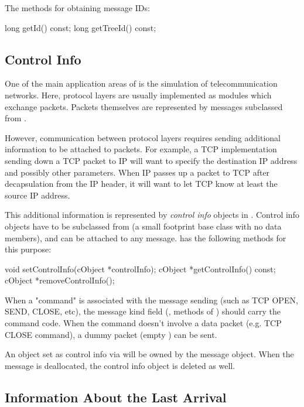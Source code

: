 The methods for obtaining message IDs:

\begin{cpp}
long getId() const;
long getTreeId() const;
\end{cpp}


\subsection{Control Info}

One of the main application areas of {\opp} is the simulation of
telecommunication networks. Here, protocol layers are usually
implemented as modules which exchange packets. Packets themselves
are represented by messages subclassed from .

However, communication between protocol layers requires sending
additional information to be attached to packets. For example,
a TCP implementation sending down a TCP packet to IP will want
to specify the destination IP address and possibly
other parameters. When IP passes up a packet to TCP after
decapsulation from the IP header, it will want to let TCP know
at least the source IP address.

This additional information is represented by \textit{control info} objects
in {\opp}. Control info objects have to be subclassed from 
(a small footprint base class with no data members), and can be attached to
any message.  has the following methods for this purpose:

\begin{cpp}
void setControlInfo(cObject *controlInfo);
cObject *getControlInfo() const;
cObject *removeControlInfo();
\end{cpp}

When a "command" is associated with the message sending (such as
TCP OPEN, SEND, CLOSE, etc), the message kind field (,
 methods of ) should carry the command code.
When the command doesn't involve a data packet (e.g.
TCP CLOSE command), a dummy packet (empty ) can be sent.

An object set as control info via  will be owned
by the message object. When the message is deallocated, the control
info object is deleted as well.


\subsection{Information About the Last Arrival}

